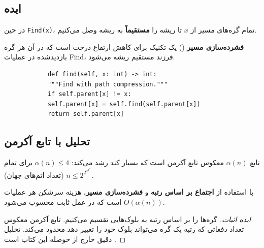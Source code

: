 \documentclass{matinbook}
\begin{document}
    \subsection{ایده}
    
    در حین \texttt{Find(x)}، تمام گره‌های
    مسیر از $x$ تا ریشه را \textbf{مستقیماً}
    به ریشه وصل می‌کنیم.
    
    \begin{definition}
        \textbf{فشرده‌سازی مسیر}
        () یک تکنیک
        برای کاهش ارتفاع درخت است که در آن
        هر گره بازدیدشده در عملیات Find،
        فرزند مستقیم ریشه می‌شود.
        \label{def:path-compression}
    \end{definition}
    
    \begin{latin}
        \begin{verbatim}
            def find(self, x: int) -> int:
            """Find with path compression."""
            if self.parent[x] != x:
            self.parent[x] = self.find(self.parent[x])
            return self.parent[x]
        \end{verbatim}
    \end{latin}
    \label{code:find-path-compression}
    
    \subsection{تحلیل با تابع آکرمن}
    
    \begin{definition}
        تابع $\alpha(n)$ معکوس تابع آکرمن
        است که بسیار کند رشد می‌کند:
        $\alpha(n) \leq 4$ برای تمام
        $n \leq 2^{2^{2^{2^{16}}}}$
        (تعداد اتم‌های جهان).
        \label{def:ackermann}
    \end{definition}
    
    \begin{theorem}
        با استفاده از \textbf{اجتماع بر اساس رتبه}
        و \textbf{فشرده‌سازی مسیر}،
        هزینه سرشکن هر عملیات
        $O(\alpha(n))$ است
        که در عمل ثابت محسوب می‌شود.
        \label{thm:tarjan-union-find}
    \end{theorem}
    
    \begin{proof}[ایده اثبات]
        گره‌ها را بر اساس رتبه به بلوک‌هایی
        تقسیم می‌کنیم. تابع آکرمن معکوس
        تعداد دفعاتی که رتبه یک گره
        می‌تواند بلوک خود را تغییر دهد
        محدود می‌کند. تحلیل دقیق
        خارج از حوصله این کتاب است
        \cite{cormen2009}.
    \end{proof}
    
\end{document}
